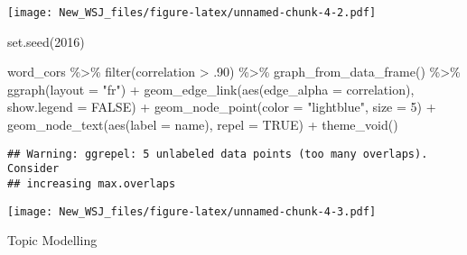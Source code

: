 \documentclass[
]{article}
\newenvironment{Shaded}{\begin{snugshade}}{\end{snugshade}}
\newcommand{\AttributeTok}[1]{\textcolor[rgb]{0.77,0.63,0.00}{#1}}
\newcommand{\ConstantTok}[1]{\textcolor[rgb]{0.00,0.00,0.00}{#1}}
\newcommand{\DecValTok}[1]{\textcolor[rgb]{0.00,0.00,0.81}{#1}}
\newcommand{\FunctionTok}[1]{\textcolor[rgb]{0.00,0.00,0.00}{#1}}
\newcommand{\NormalTok}[1]{#1}
\newcommand{\SpecialCharTok}[1]{\textcolor[rgb]{0.00,0.00,0.00}{#1}}
\newcommand{\StringTok}[1]{\textcolor[rgb]{0.31,0.60,0.02}{#1}}
\begin{document}
\texttt{[image: New\_WSJ\_files/figure-latex/unnamed-chunk-4-2.pdf]}

\begin{Shaded}
\begin{Highlighting}[]
\FunctionTok{set.seed}\NormalTok{(}\DecValTok{2016}\NormalTok{)}

\NormalTok{word\_cors }\SpecialCharTok{\%\textgreater{}\%}
  \FunctionTok{filter}\NormalTok{(correlation }\SpecialCharTok{\textgreater{}}\NormalTok{ .}\DecValTok{90}\NormalTok{) }\SpecialCharTok{\%\textgreater{}\%}
  \FunctionTok{graph\_from\_data\_frame}\NormalTok{() }\SpecialCharTok{\%\textgreater{}\%}
  \FunctionTok{ggraph}\NormalTok{(}\AttributeTok{layout =} \StringTok{"fr"}\NormalTok{) }\SpecialCharTok{+}
  \FunctionTok{geom\_edge\_link}\NormalTok{(}\FunctionTok{aes}\NormalTok{(}\AttributeTok{edge\_alpha =}\NormalTok{ correlation), }\AttributeTok{show.legend =} \ConstantTok{FALSE}\NormalTok{) }\SpecialCharTok{+}
  \FunctionTok{geom\_node\_point}\NormalTok{(}\AttributeTok{color =} \StringTok{"lightblue"}\NormalTok{, }\AttributeTok{size =} \DecValTok{5}\NormalTok{) }\SpecialCharTok{+}
  \FunctionTok{geom\_node\_text}\NormalTok{(}\FunctionTok{aes}\NormalTok{(}\AttributeTok{label =}\NormalTok{ name), }\AttributeTok{repel =} \ConstantTok{TRUE}\NormalTok{) }\SpecialCharTok{+}
  \FunctionTok{theme\_void}\NormalTok{()}
\end{Highlighting}
\end{Shaded}

\begin{verbatim}
## Warning: ggrepel: 5 unlabeled data points (too many overlaps). Consider
## increasing max.overlaps
\end{verbatim}

\texttt{[image: New\_WSJ\_files/figure-latex/unnamed-chunk-4-3.pdf]}

Topic Modelling
\end{document}
